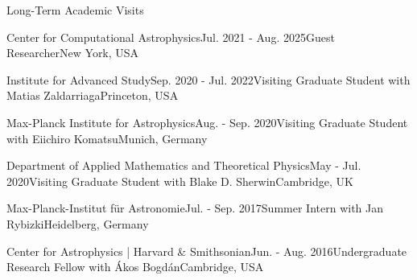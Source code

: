 \documentclass{resume} %
\begin{document}
\begin{rSection}{Long-Term Academic Visits}%

\begin{rSubsection}{Center for Computational Astrophysics}{Jul. 2021 - Aug. 2025}{Guest Researcher}{New York, USA}
\end{rSubsection}

\begin{rSubsection}{Institute for Advanced Study}{Sep. 2020 - Jul. 2022}{Visiting Graduate Student with Matias Zaldarriaga}{Princeton, USA}
\end{rSubsection}

\begin{rSubsection}{Max-Planck Institute for Astrophysics}{Aug. - Sep. 2020}{Visiting Graduate Student with Eiichiro Komatsu}{Munich, Germany}
\end{rSubsection}

\begin{rSubsection}{Department of Applied Mathematics and Theoretical Physics}{May - Jul. 2020}{Visiting Graduate Student with Blake D. Sherwin}{Cambridge, UK}
\end{rSubsection}




\begin{rSubsection}{Max-Planck-Institut f\"{u}r Astronomie}{Jul. - Sep. 2017}{Summer Intern with Jan Rybizki}{Heidelberg, Germany}
\end{rSubsection}

\begin{rSubsection}{Center for Astrophysics | Harvard \& Smithsonian}{Jun. - Aug. 2016}{Undergraduate Research Fellow with \'{A}kos Bogd\'{a}n}{Cambridge, USA}
\end{rSubsection}
\end{rSection}
\end{document}
